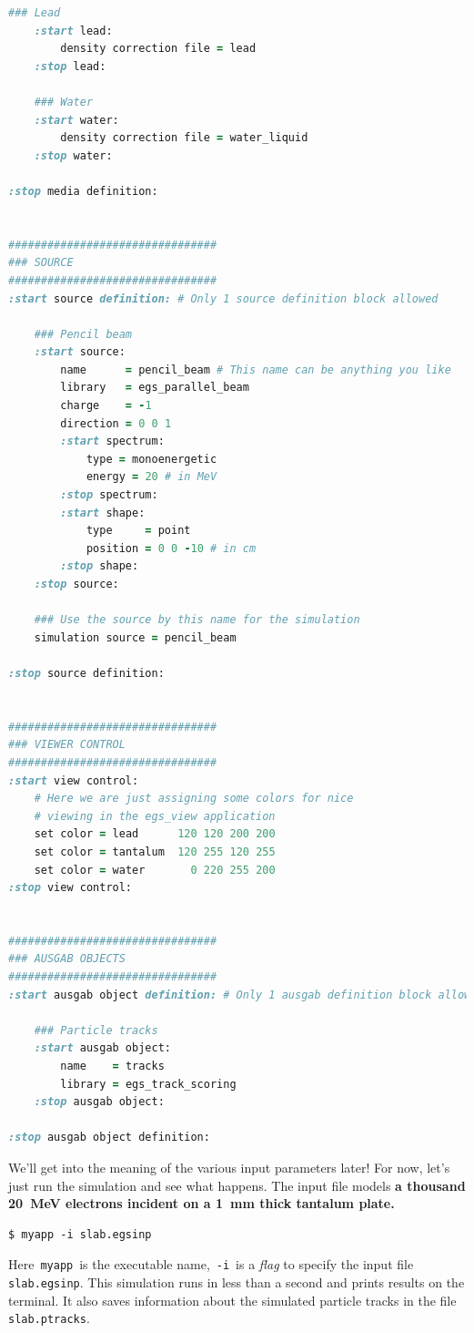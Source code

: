 \documentclass[12pt,twoside]{article}
\begin{document}
\begin{lstlisting}[language=ruby,backgroundcolor=\color{white}]
    ### Lead
    :start lead:
        density correction file = lead
    :stop lead:

    ### Water
    :start water:
        density correction file = water_liquid
    :stop water:

:stop media definition:


################################
### SOURCE
################################
:start source definition: # Only 1 source definition block allowed

    ### Pencil beam
    :start source:
        name      = pencil_beam # This name can be anything you like
        library   = egs_parallel_beam
        charge    = -1
        direction = 0 0 1
        :start spectrum:
            type = monoenergetic
            energy = 20 # in MeV
        :stop spectrum:
        :start shape:
            type     = point
            position = 0 0 -10 # in cm
        :stop shape:
    :stop source:

    ### Use the source by this name for the simulation
    simulation source = pencil_beam

:stop source definition:


################################
### VIEWER CONTROL
################################
:start view control:
    # Here we are just assigning some colors for nice
    # viewing in the egs_view application
    set color = lead      120 120 200 200
    set color = tantalum  120 255 120 255
    set color = water       0 220 255 200
:stop view control:


################################
### AUSGAB OBJECTS
################################
:start ausgab object definition: # Only 1 ausgab definition block allowed

    ### Particle tracks
    :start ausgab object:
        name    = tracks
        library = egs_track_scoring
    :stop ausgab object:

:stop ausgab object definition:
\end{lstlisting}

We'll get into the meaning of the various input parameters later! For now,
let's just run the simulation and see what happens. The input file models
\textbf{a thousand 20~MeV electrons incident on a 1~mm
thick tantalum plate.}

\begin{lstlisting}
$ myapp -i slab.egsinp
\end{lstlisting}

Here \,\Verb|myapp|\, is the executable name, \,\Verb|-i|\, is a
\textit{flag} to specify the input file \,\Verb|slab.egsinp|. This
simulation runs in less than a second and prints results on the
terminal. It also saves information about the simulated particle tracks
in the file \,\Verb|slab.ptracks|.
\end{document}
